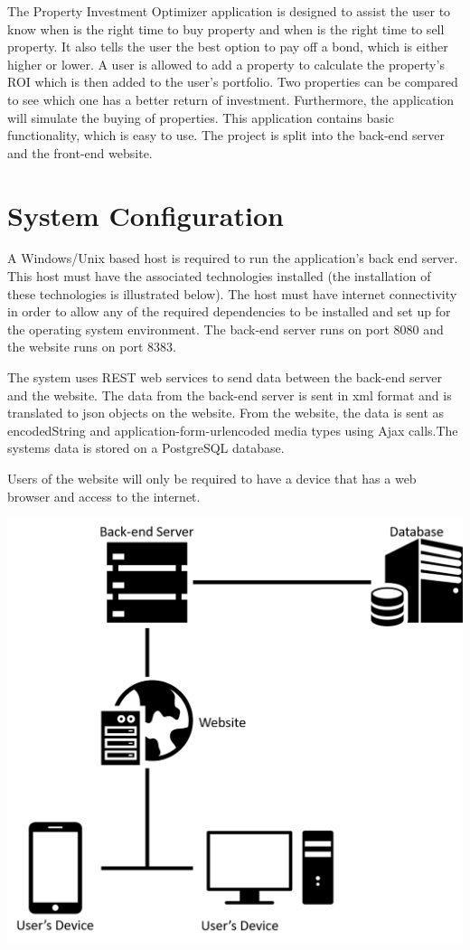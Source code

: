 \documentclass[a4paper,12pt]{article}
\begin{document}
The Property Investment Optimizer application is designed to assist the user to know when is the right time to buy property and when is the right time to sell property. It also tells the user the best option to pay off a bond, which is either higher or lower. A user is allowed to add a property to calculate the property's ROI which is then added to the user's portfolio. Two properties can be compared to see which one has a better return of investment. Furthermore, the application will simulate the buying of properties. This application contains basic functionality, which is easy to use. The project is split into the back-end server and the front-end website.
\section{System Configuration}
A Windows/Unix based host  is required to run the application's back end server. This
host must have the associated technologies installed (the installation of these
technologies is illustrated below). The host must have internet connectivity in order to allow any of the required dependencies to be installed and set
up for the operating system environment. The back-end server runs on port 8080 and the website runs on port 8383.



The system uses REST web services to send data between the back-end server and the website. The data from the back-end server is sent in xml format and is translated to json objects on the website. From the website, the data is sent as encodedString and application-form-urlencoded media types using Ajax calls.The systems data is stored on a PostgreSQL database.

Users of the website will only be required to have a device that has a web browser and access to the internet.

\includegraphics[width=0.9\linewidth, center]{./System/system.png}\\[0.4cm]
\end{document}
